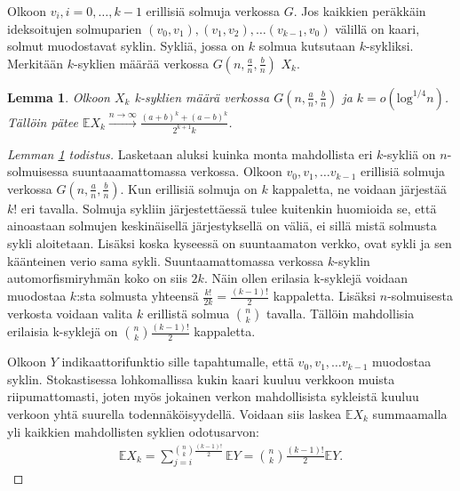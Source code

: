 \documentclass[finnish,12pt,a4paper,pdftex,sci,utf8]{aaltothesis}
\newtheorem{lemma}{Lemma}
\begin{document}
Olkoon $v_i, i = 0, \ldots, k-1$ erillisiä solmuja verkossa $G$. Jos kaikkien peräkkäin ideksoitujen solmuparien $(v_0, v_1), (v_1, v_2), \ldots (v_{k-1}, v_0)$ välillä on kaari, solmut muodostavat syklin. Sykliä, jossa on $k$ solmua kutsutaan $k$-sykliksi. Merkitään $k$-syklien määrää verkossa $G(n, \frac{a}{n}, \frac{b}{n})$ $X_k$.

\begin{lemma}
	\label{lemma:k-syklit_odotus}
	Olkoon $X_k$ k-syklien määrä verkossa $G(n,\frac{a}{n},\frac{b}{n})$ ja $k = o(\text{log}^{1/4}n)$. Tällöin pätee $\mathbb{E}X_k \xrightarrow{n \rightarrow \infty} \frac{(a+b)^k + (a-b)^k}{2^{k+1}k}$. 
\end{lemma}

\begin{proof}[Lemman \ref{lemma:k-syklit_odotus} todistus]
	Lasketaan aluksi kuinka monta mahdollista eri $k$-sykliä on $n$-solmuisessa suuntaaamattomassa verkossa. Olkoon $v_0, v_1, \ldots v_{k-1}$ erillisiä solmuja verkossa $G(n,\frac{a}{n},\frac{b}{n})$. Kun erillisiä solmuja on $k$ kappaletta, ne voidaan järjestää $k!$ eri tavalla. Solmuja sykliin järjestettäessä tulee kuitenkin huomioida se, että ainoastaan solmujen keskinäisellä järjestyksellä on väliä, ei sillä mistä solmusta sykli aloitetaan. Lisäksi koska kyseessä on suuntaamaton verkko, ovat sykli ja sen käänteinen verio sama sykli. Suuntaamattomassa verkossa $k$-syklin automorfismiryhmän koko on siis $2k$. Näin ollen erilasia k-syklejä voidaan muodostaa $k$:sta solmusta yhteensä $\frac{k!}{2k} = \frac{(k-1)!}{2}$ kappaletta. Lisäksi $n$-solmuisesta verkosta voidaan valita $k$ erillistä solmua $\binom{n}{k}$ tavalla. Tällöin mahdollisia erilaisia k-syklejä on $\binom{n}{k} \frac{(k-1)!}{2}$ kappaletta.
	
	Olkoon $Y$ indikaattorifunktio sille tapahtumalle, että $v_0, v_1, \ldots v_{k-1}$ muodostaa syklin. Stokastisessa lohkomallissa kukin kaari kuuluu verkkoon muista riipumattomasti, joten myös jokainen verkon mahdollisista sykleistä kuuluu verkoon yhtä suurella todennäköisyydellä. Voidaan siis laskea $\mathbb{E}X_k$ summaamalla yli kaikkien mahdollisten syklien odotusarvon:
	\begin{align*}
		\mathbb{E} X_k = \sum_{j = i}^{\binom{n}{k} \frac{(k-1)!}{2}} \mathbb{E} Y = \binom{n}{k} \frac{(k-1)!}{2} \mathbb{E} Y.
	\end{align*}


\end{proof}
\end{document}
